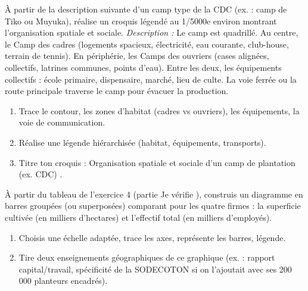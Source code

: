 \documentclass[11pt]{article}
\begin{document}
\begin{exercice}
À partir de la description suivante d'un camp type de la CDC (ex. : camp de Tiko ou Muyuka), réalise un croquis légendé au 1/5000e environ montrant l'organisation spatiale et sociale.
\textit{Description :} Le camp est quadrillé. Au centre, le \og Camp des cadres \fg{} (logements spacieux, électricité, eau courante, club-house, terrain de tennis). En périphérie, les \og Camps des ouvriers \fg{} (cases alignées, collectifs, latrines communes, points d'eau). Entre les deux, les équipements collectifs : école primaire, dispensaire, marché, lieu de culte. La voie ferrée ou la route principale traverse le camp pour évacuer la production.
\begin{enumerate}
\item Trace le contour, les zones d'habitat (cadres vs ouvriers), les équipements, la voie de communication.
\item Réalise une légende hiérarchisée (habitat, équipements, transports).
\item Titre ton croquis : \og Organisation spatiale et sociale d'un camp de plantation (ex. CDC) \fg.
\end{enumerate}
\end{exercice}

\begin{exercice}
À partir du tableau de l'exercice 4 (partie \og Je vérifie \fg), construis un diagramme en barres groupées (ou superposées) comparant pour les quatre firmes : la superficie cultivée (en milliers d'hectares) et l'effectif total (en milliers d'employés).
\begin{enumerate}
\item Choisis une échelle adaptée, trace les axes, représente les barres, légende.
\item Tire deux enseignements géographiques de ce graphique (ex. : rapport capital/travail, spécificité de la SODECOTON si on l'ajoutait avec ses 200\,000 planteurs encadrés).
\end{enumerate}
\end{exercice}
\end{document}
